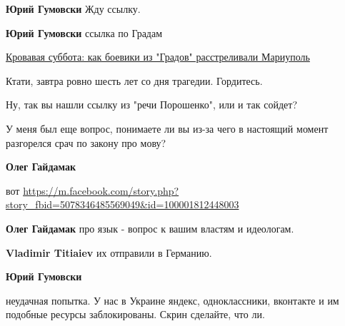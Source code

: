 \begin{itemize}
\begin{itemize}

\textbf{Юрий Гумовски} Жду ссылку.


\textbf{Юрий Гумовски} ссылка по Градам

\href{https://tsn.ua/ru/ukrayina/krovavaya-subbota-kak-boeviki-iz-gradov-rasstrelivali-mariupol-407186.html}{%
Кровавая суббота: как боевики из "Градов" расстреливали Мариуполь}

Ктати, завтра ровно шесть лет со дня трагедии. Гордитесь.



Ну, так вы нашли ссылку из "речи Порошенко", или и так сойдет?

У меня был еще вопрос, понимаете ли вы из-за чего в настоящий момент разгорелся
срач по закону про мову?



\textbf{Олег Гайдамак} 

вот \url{https://m.facebook.com/story.php?story_fbid=5078346485569049&id=100001812448003}


\textbf{Олег Гайдамак} про язык - вопрос к вашим властям и идеологам.


\textbf{Vladimir Titiaiev} их отправили в Германию.


\textbf{Юрий Гумовски} 

неудачная попытка. У нас в Украине яндекс, одноклассники, вконтакте и им
подобные ресурсы заблокированы. Скрин сделайте, что ли.




\end{itemize}
\end{itemize}
